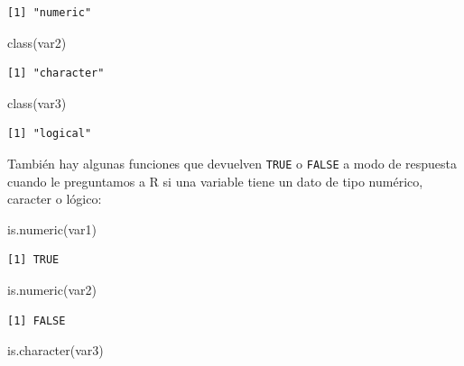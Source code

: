 \documentclass[
]{book}
\newenvironment{Shaded}{\begin{snugshade}}{\end{snugshade}}
\newcommand{\FunctionTok}[1]{\textcolor[rgb]{0.00,0.00,0.00}{#1}}
\newcommand{\NormalTok}[1]{#1}
\begin{document}
\begin{verbatim}
[1] "numeric"
\end{verbatim}

\begin{Shaded}
\begin{Highlighting}[]
\FunctionTok{class}\NormalTok{(var2)}
\end{Highlighting}
\end{Shaded}

\begin{verbatim}
[1] "character"
\end{verbatim}

\begin{Shaded}
\begin{Highlighting}[]
\FunctionTok{class}\NormalTok{(var3)}
\end{Highlighting}
\end{Shaded}

\begin{verbatim}
[1] "logical"
\end{verbatim}

También hay algunas funciones que devuelven \texttt{TRUE} o \texttt{FALSE} a modo de respuesta cuando le preguntamos a R si una variable tiene un dato de tipo numérico, caracter o lógico:

\begin{Shaded}
\begin{Highlighting}[]
\FunctionTok{is.numeric}\NormalTok{(var1)}
\end{Highlighting}
\end{Shaded}

\begin{verbatim}
[1] TRUE
\end{verbatim}

\begin{Shaded}
\begin{Highlighting}[]
\FunctionTok{is.numeric}\NormalTok{(var2)}
\end{Highlighting}
\end{Shaded}

\begin{verbatim}
[1] FALSE
\end{verbatim}

\begin{Shaded}
\begin{Highlighting}[]
\FunctionTok{is.character}\NormalTok{(var3)}
\end{Highlighting}
\end{Shaded}
\end{document}
